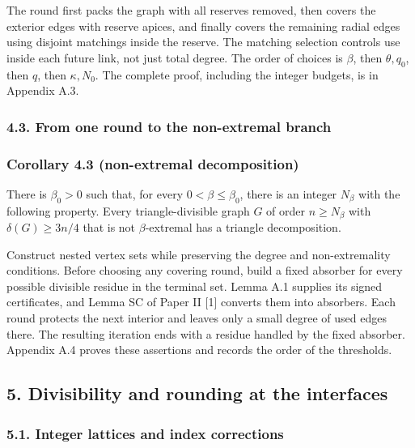 \documentclass[english,11pt,a4paper]{article}
\begin{document}
The round first packs the graph with all reserves removed, then covers the exterior edges with reserve apices, and finally covers the remaining radial edges using disjoint matchings inside the reserve. The matching selection controls use inside each future link, not just total degree. The order of choices is \(\beta\), then \(\theta,q_0\), then \(q\), then \(\kappa,N_0\). The complete proof, including the integer budgets, is in Appendix A.3.


\subsubsection{4.3. From one round to the non-extremal branch}\label{from-one-round-to-the-non-extremal-branch}

\subsubsection{Corollary 4.3 (non-extremal decomposition)}\label{corollary-4.3-non-extremal-decomposition}

There is \(\beta_0>0\) such that, for every \(0<\beta\le\beta_0\), there is an integer \(N_\beta\) with the following property. Every triangle-divisible graph \(G\) of order \(n\ge N_\beta\) with \(\delta(G)\ge3n/4\) that is not \(\beta\)-extremal has a triangle decomposition.

Construct nested vertex sets while preserving the degree and non-extremality conditions. Before choosing any covering round, build a fixed absorber for every possible divisible residue in the terminal set. Lemma A.1 supplies its signed certificates, and Lemma SC of Paper II {[}1{]} converts them into absorbers. Each round protects the next interior and leaves only a small degree of used edges there. The resulting iteration ends with a residue handled by the fixed absorber. Appendix A.4 proves these assertions and records the order of the thresholds.


\subsection{5. Divisibility and rounding at the interfaces}\label{divisibility-and-rounding-at-the-interfaces}

\subsubsection{5.1. Integer lattices and index corrections}\label{integer-lattices-and-index-corrections}
\end{document}
